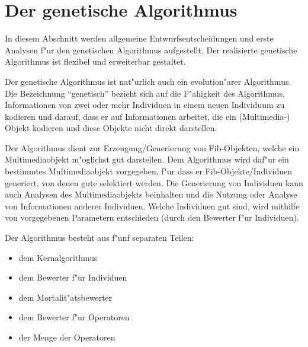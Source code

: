 %
%
%
%

\graphicspath{{./material_enviroment/}}
\graphicspath{{./material_enviroment/}{../material_enviroment}}

\newpage
\part{Der genetische Algorithmus}
\label{secGeneticAlgorithmDesign}

In diesem Abschnitt werden allgemeine Entwurfsentscheidungen und erste Analysen f"ur den genetischen Algorithmus aufgestellt.
Der realisierte genetische Algorithmus ist flexibel und erweiterbar gestaltet.

Der genetische Algorithmus ist nat"urlich auch ein evolution"arer Algorithmus. Die Bezeichnung ``genetisch'' bezieht sich auf die F"ahigkeit des Algorithmus, Informationen von zwei oder mehr Individuen in einem neuen Individuum zu kodieren und darauf, dass er auf Informationen arbeitet, die ein (Multimedia-) Objekt kodieren und diese Objekte nicht direkt darstellen.

Der Algorithmus dient zur Erzeugung/Generierung von Fib-Objekten, welche ein Multimediaobjekt m"oglichst gut darstellen. Dem Algorithmus wird daf"ur ein bestimmtes Multimediaobjekt vorgegeben, f"ur dass er Fib-Objekte/Individuen generiert, von denen gute selektiert werden. Die Generierung von Individuen kann auch Analysen des Multimediaobjekts beinhalten und die Nutzung oder Analyse von Informationen anderer Individuen. Welche Individuen gut sind, wird mithilfe von vorgegebenen Parametern entschieden (durch den Bewerter f"ur Individuen).

\bigskip\noindent
Der Algorithmus besteht aus f"unf separaten Teilen:
\begin{itemize}
 \item dem Kernalgorithmus
 \item dem Bewerter f"ur Individuen
 \item dem Mortalit"atsbewerter
 \item dem Bewerter f"ur Operatoren
 \item der Menge der Operatoren
\end{itemize}


